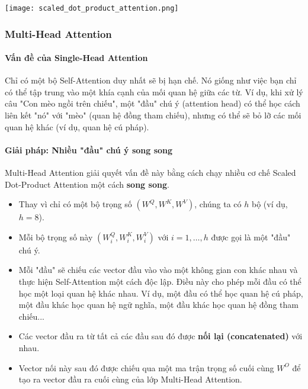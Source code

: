 \begin{center}
    \texttt{[image: scaled\_dot\_product\_attention.png]}
    \label{fig:scaled_dot_product_attention}
\end{center}

\subsubsection{Multi-Head Attention}
\paragraph{Vấn đề của Single-Head Attention}
Chỉ có một bộ Self-Attention duy nhất sẽ bị hạn chế. Nó giống như việc bạn chỉ có thể tập trung vào một khía cạnh của mối quan hệ giữa các từ. Ví dụ, khi xử lý câu "Con mèo ngồi trên chiếu", một "đầu" chú ý (attention head) có thể học cách liên kết "nó" với "mèo" (quan hệ đồng tham chiếu), nhưng có thể sẽ bỏ lỡ các mối quan hệ khác (ví dụ, quan hệ cú pháp).

\paragraph{Giải pháp: Nhiều "đầu" chú ý song song}
Multi-Head Attention giải quyết vấn đề này bằng cách chạy nhiều cơ chế Scaled Dot-Product Attention một cách \textbf{song song}.
\begin{itemize}
    \item Thay vì chỉ có một bộ trọng số $(W^Q, W^K, W^V)$, chúng ta có $h$ bộ (ví dụ, $h=8$).
    \item Mỗi bộ trọng số này $(W^Q_i, W^K_i, W^V_i)$ với $i=1,\dots,h$ được gọi là một "đầu" chú ý.
    \item Mỗi "đầu" sẽ chiếu các vector đầu vào vào một không gian con khác nhau và thực hiện Self-Attention một cách độc lập. Điều này cho phép mỗi đầu có thể học một loại quan hệ khác nhau. Ví dụ, một đầu có thể học quan hệ cú pháp, một đầu khác học quan hệ ngữ nghĩa, một đầu khác học quan hệ đồng tham chiếu...
    \item Các vector đầu ra từ tất cả các đầu sau đó được \textbf{nối lại (concatenated)} với nhau.
    \item Vector nối này sau đó được chiếu qua một ma trận trọng số cuối cùng $W^O$ để tạo ra vector đầu ra cuối cùng của lớp Multi-Head Attention.
\end{itemize}

